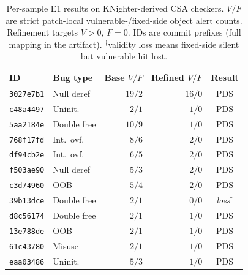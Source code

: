 \begin{table}[t]
  \centering
  \scriptsize
  \setlength{\tabcolsep}{4pt}
  \caption{Per-sample E1 results on KNighter-derived CSA checkers.  $V/F$ are strict patch-local vulnerable-/fixed-side object alert counts. Refinement targets $V{>}0,\,F{=}0$.  IDs are commit prefixes (full mapping in the artifact).  $^\dagger$validity loss means fixed-side silent but vulnerable hit lost.}
  \label{tab:e1-persample}
  \begin{tabular}{@{}llrrc@{}}
    \toprule
    ID & Bug type & Base $V/F$ & Refined $V/F$ & Result \\
    \midrule
    \texttt{3027e7b1} & Null deref  & $19/2$ & $16/0$ & PDS \\
    \texttt{c48a4497} & Uninit.     & $2/1$  & $1/0$  & PDS \\
    \texttt{5aa2184e} & Double free & $10/9$ & $1/0$  & PDS \\
    \texttt{768f17fd} & Int.\ ovf.  & $8/6$  & $2/0$  & PDS \\
    \texttt{df94cb2e} & Int.\ ovf.  & $6/5$  & $2/0$  & PDS \\
    \texttt{f503ae90} & Null deref  & $5/3$  & $2/0$  & PDS \\
    \texttt{c3d74960} & OOB         & $5/4$  & $2/0$  & PDS \\
    \texttt{39b13dce} & Double free & $2/1$  & $0/0$  & \emph{loss}$^\dagger$ \\
    \texttt{d8c56174} & Double free & $2/1$  & $1/0$  & PDS \\
    \texttt{13e788de} & OOB         & $2/1$  & $1/0$  & PDS \\
    \texttt{61c43780} & Misuse      & $2/1$  & $1/0$  & PDS \\
    \texttt{eaa03486} & Uninit.     & $5/3$  & $1/0$  & PDS \\
    \bottomrule
  \end{tabular}
\end{table}
